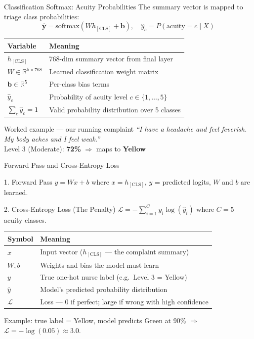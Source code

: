 \documentclass[10pt,aspectratio=169]{beamer}
\newcommand{\complaint}{\textit{``I have a headache and feel feverish. My body aches and I feel weak.''}}
\begin{document}
\begin{frame}{Classification Softmax: Acuity Probabilities}
	\small
	The summary vector is mapped to triage class probabilities:
	\[
		\hat{\mathbf{y}} = \mathrm{softmax}(W h_{\mathrm{[CLS]}} + \mathbf{b}), \quad \hat{y}_c = P(\text{acuity} = c \mid X)
	\]
	\begin{tabular}{@{}p{2.8cm}p{8.2cm}@{}}
		\toprule
		\textbf{Variable} & \textbf{Meaning} \\
		\midrule
		$h_{\mathrm{[CLS]}}$ & 768-dim summary vector from final layer \\
		$W \in \mathbb{R}^{5 \times 768}$ & Learned classification weight matrix \\
		$\mathbf{b} \in \mathbb{R}^{5}$ & Per-class bias terms \\
		$\hat{y}_c$ & Probability of acuity level $c \in \{1,\ldots,5\}$ \\
		$\sum_c \hat{y}_c = 1$ & Valid probability distribution over 5 classes \\
		\bottomrule
	\end{tabular}

	\vspace{0.1cm}
	\begin{exampleblock}{Worked example --- our running complaint}
		\footnotesize
		\complaint\\
		Level 3 (Moderate): \textbf{72\%} $\Rightarrow$ maps to \textcolor{triageYellow}{\textbf{Yellow}}
	\end{exampleblock}
\end{frame}

\begin{frame}{Forward Pass and Cross-Entropy Loss}
	\small
	\begin{block}{1. Forward Pass}
		$y = Wx + b$ \quad where $x = h_{\mathrm{[CLS]}}$, $y$ = predicted logits, $W$ and $b$ are learned.
	\end{block}
	\begin{block}{2. Cross-Entropy Loss (The Penalty)}
		$\mathcal{L} = -\sum_{i=1}^{C} y_i \log(\hat{y}_i)$ \quad where $C = 5$ acuity classes.
	\end{block}
	\begin{tabular}{@{}p{1.8cm}p{9.2cm}@{}}
		\toprule
		\textbf{Symbol} & \textbf{Meaning} \\
		\midrule
		$x$ & Input vector ($h_{\mathrm{[CLS]}}$ --- the complaint summary) \\
		$W, b$ & Weights and bias the model must learn \\
		$y$ & True one-hot nurse label (e.g.\ Level 3 = Yellow) \\
		$\hat{y}$ & Model's predicted probability distribution \\
		$\mathcal{L}$ & Loss --- 0 if perfect; large if wrong with high confidence \\
		\bottomrule
	\end{tabular}

	\vspace{0.1cm}
	\footnotesize Example: true label = Yellow, model predicts Green at 90\% $\Rightarrow$ $\mathcal{L} = -\log(0.05) \approx 3.0$.
\end{frame}
\end{document}
